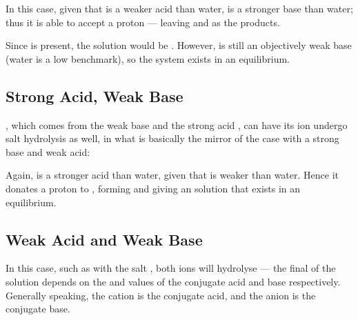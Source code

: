 
			In this case, given that  is a weaker acid than water,  is a stronger base than water; thus it is
			able to accept a proton --- leaving  and  as the products.

			Since  is present, the solution would be . However,  is still an objectively weak base
			(water is a low benchmark), so the system exists in an equilibrium.



		\subsection{Strong Acid, Weak Base}
			, which comes from the weak base  and the strong acid , can have its  ion undergo
			salt hydrolysis as well, in what is basically the mirror of the case with a strong base and weak acid:


			Again,  is a stronger acid than water, given that  is weaker than water. Hence it donates a proton to ,
			forming  and giving an  solution that exists in an equilibrium.



		\pagebreak
		\subsection{Weak Acid and Weak Base}

			In this case, such as with the salt , both ions will hydrolyse --- the final \pH{} of the solution depends on
			the \Ka{} and \Kb{} values of the conjugate acid and base respectively. Generally speaking, the cation is the conjugate acid,
			and the anion is the conjugate base.

